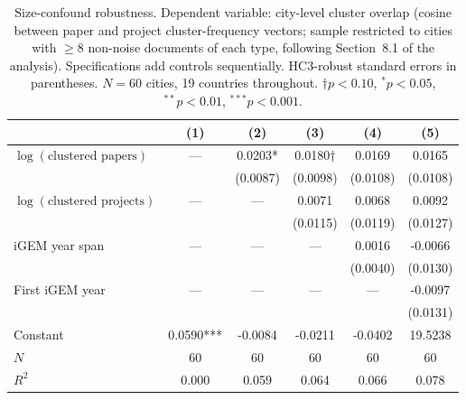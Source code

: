 \begin{table}[htbp]
\centering
\caption{Size-confound robustness. Dependent variable: city-level cluster overlap (cosine between paper and project cluster-frequency vectors; sample restricted to cities with $\geq 8$ non-noise documents of each type, following Section~8.1 of the analysis). Specifications add controls sequentially. HC3-robust standard errors in parentheses. $N=60$ cities, 19 countries throughout. $\dagger p<0.10$, $^{*}p<0.05$, $^{**}p<0.01$, $^{***}p<0.001$.}
\label{tab:size_robust}
\begin{tabular}{lccccc}
\toprule
& (1) & (2) & (3) & (4) & (5) \\
\midrule
$\log(\text{clustered papers})$ & — & 0.0203* & 0.0180$\dagger$ & 0.0169 & 0.0165 \\
&  & (0.0087) & (0.0098) & (0.0108) & (0.0108) \\[4pt]
$\log(\text{clustered projects})$ & — & — & 0.0071 & 0.0068 & 0.0092 \\
&  &  & (0.0115) & (0.0119) & (0.0127) \\[4pt]
iGEM year span & — & — & — & 0.0016 & -0.0066 \\
&  &  &  & (0.0040) & (0.0130) \\[4pt]
First iGEM year & — & — & — & — & -0.0097 \\
&  &  &  &  & (0.0131) \\[4pt]
\midrule
Constant & 0.0590*** & -0.0084 & -0.0211 & -0.0402 & 19.5238 \\
\midrule
$N$ & 60 & 60 & 60 & 60 & 60 \\
$R^2$ & 0.000 & 0.059 & 0.064 & 0.066 & 0.078 \\
\bottomrule
\end{tabular}
\end{table}